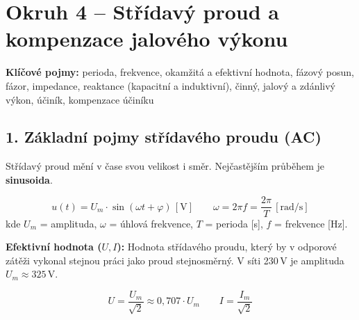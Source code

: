 \documentclass[a4paper,10pt]{article}
\newcommand{\jednotka}[1]{\,[\mathrm{#1}]}
\begin{document}
\section*{\large Okruh 4 – Střídavý proud a kompenzace jalového výkonu}

\begin{pojmybox}
\textbf{Klíčové pojmy:}
perioda, frekvence, okamžitá a efektivní hodnota, fázový posun, fázor, impedance, reaktance (kapacitní a induktivní), činný, jalový a zdánlivý výkon, účiník, kompenzace účiníku
\end{pojmybox}

\begin{vysvetlenibox}

\subsection*{1. Základní pojmy střídavého proudu (AC)}

Střídavý proud mění v čase svou velikost i směr. Nejčastějším průběhem je \textbf{sinusoida}.

\begin{vzorcebox}
\[
u(t) = U_m \cdot \sin(\omega t + \varphi) \jednotka{V}
\qquad
\omega = 2\pi f = \frac{2\pi}{T} \jednotka{rad/s}
\]
kde $U_m$ = amplituda, $\omega$ = úhlová frekvence, $T$ = perioda [s], $f$ = frekvence [Hz].
\end{vzorcebox}

\textbf{Efektivní hodnota ($U, I$):} Hodnota střídavého proudu, který by v odporové zátěži vykonal stejnou práci jako proud stejnosměrný. V síti 230\,V je amplituda $U_m \approx 325$\,V.
\begin{vzorcebox}
\[
U = \frac{U_m}{\sqrt{2}} \approx 0{,}707 \cdot U_m
\qquad
I = \frac{I_m}{\sqrt{2}}
\]
\end{vzorcebox}

\begin{center}
\end{center}


\end{vysvetlenibox}
\end{document}
